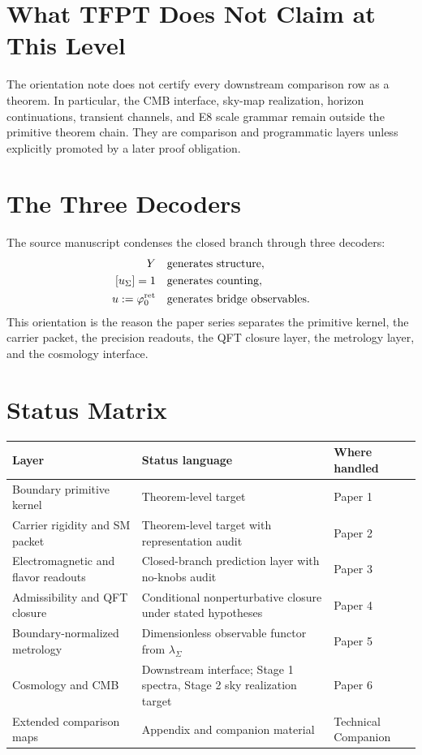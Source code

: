 \documentclass[11pt,a4paper]{article}
\begin{document}
\section{What TFPT Does Not Claim at This Level}

The orientation note does not certify every downstream comparison row as a theorem. In particular,
the CMB interface, sky-map realization, horizon continuations, transient channels, and E8 scale
grammar remain outside the primitive theorem chain. They are comparison and programmatic layers
unless explicitly promoted by a later proof obligation.

\section{The Three Decoders}

The source manuscript condenses the closed branch through three decoders:
\[
\begin{aligned}
Y&\quad\text{generates structure},\\
[u_\Sigma]=1&\quad\text{generates counting},\\
u:=\varphi_0^{\mathrm{ret}}&\quad\text{generates bridge observables}.
\end{aligned}
\]
This orientation is the reason the paper series separates the primitive kernel, the carrier
packet, the precision readouts, the QFT closure layer, the metrology layer, and the cosmology
interface.

\section{Status Matrix}

\begin{center}
\begin{tabularx}{\textwidth}{@{}p{}p{}Y@{}}
\toprule
\textbf{Layer} & \textbf{Status language} & \textbf{Where handled} \\
\midrule
Boundary primitive kernel & Theorem-level target & Paper 1 \\
Carrier rigidity and SM packet & Theorem-level target with representation audit & Paper 2 \\
Electromagnetic and flavor readouts & Closed-branch prediction layer with no-knobs audit & Paper 3 \\
Admissibility and QFT closure & Conditional nonperturbative closure under stated hypotheses & Paper 4 \\
Boundary-normalized metrology & Dimensionless observable functor from $\lambda_\Sigma$ & Paper 5 \\
Cosmology and CMB & Downstream interface; Stage 1 spectra, Stage 2 sky realization target & Paper 6 \\
Extended comparison maps & Appendix and companion material & Technical Companion \\
\bottomrule
\end{tabularx}
\end{center}
\end{document}
